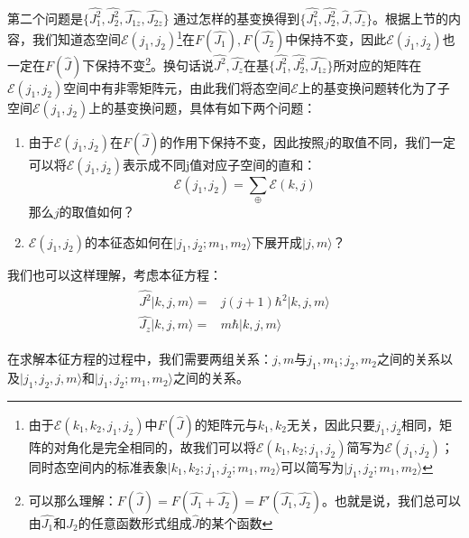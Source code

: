     第二个问题是$\{\hat{J_1^2},\hat{J_2^2},\widehat{J_{1z}},\widehat{J_{2z}}\}$ 通过怎样的基变换得到$ \{\hat{J_1^2},\hat{J_2^2},\hat{J},\hat{J_z}\}$。根据上节的内容，我们知道态空间$\mathcal{E}(j_1,j_2)$\footnote{由于$\mathcal{E}(k_1,k_2,j_1,j_2)\textrm{中}F(\hat{J})$的矩阵元与$k_1,k_2$无关，因此只要$j_1,j_2$相同，矩阵的对角化是完全相同的，故我们可以将$\mathcal{E}(k_1,k_2;j_1,j_2)$简写为$\mathcal{E}(j_1,j_2)$；同时态空间内的标准表象$|k_1,k_2;j_1,j_2;m_1,m_2\rangle$可以简写为$|j_1,j_2;m_1,m_2\rangle$}在$F(\hat{J_1}),F(\hat{J_2})$中保持不变，因此$\mathcal{E}(j_1,j_2)$也一定在$F(\hat{J})$下保持不变\footnote{可以那么理解：$F(\hat{J})=F(\hat{J_1}+\hat{J_2})=F'(\hat{J_1},\hat{J_2})$。也就是说，我们总可以由$\hat{J_1}\textrm{和}\hat{J_2}$的任意函数形式组成$\hat{J}$的某个函数}。换句话说$\hat{J^2},\hat{J_z}$在基$\{\hat{J_1^2},\hat{J_2^2},\widehat{J_{1z}}\}$所对应的矩阵在$\mathcal{E}(j_1,j_2)$空间中有非零矩阵元，由此我们将态空间$\mathcal{E}$上的基变换问题转化为了子空间$\mathcal{E}(j_1,j_2)$上的基变换问题，具体有如下两个问题：
    \begin{enumerate}
        \item 由于$\mathcal{E}(j_1,j_2)$在$F(\hat{J})$的作用下保持不变，因此按照$j$的取值不同，我们一定可以将$\mathcal{E}(j_1,j_2)$表示成不同j值对应子空间的直和：
        \begin{equation}
            \mathcal{E}(j_1,j_2)=\sum_{\oplus}\mathcal{E}(k,j)
        \end{equation}
        那么$j$的取值如何？
        \item $\mathcal{E}(j_1,j_2)$的本征态如何在$|j_1,j_2;m_1,m_2\rangle$下展开成$|j,m
        \rangle$？
    \end{enumerate}
    
    我们也可以这样理解，考虑本征方程：
    \begin{align}
        \begin{split}
            \hat{J^2}|k,j,m\rangle=&j(j+1)\hbar^2|k,j,m\rangle\\
            \hat{J_z}|k,j,m\rangle=&m\hbar|k,j,m\rangle
        \end{split}
    \end{align}
    
    在求解本征方程的过程中，我们需要两组关系：$j,m\textrm{与}j_1,m_1;j_2,m_2$之间的关系以及$|j_1,j_2,j,m\rangle$和$|j_1,j_2;m_1,m_2\rangle$之间的关系。
    

